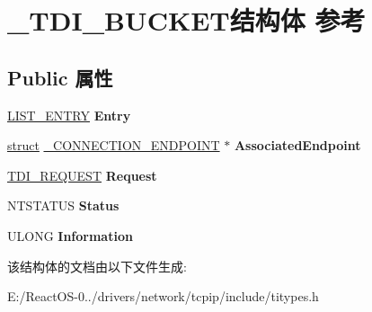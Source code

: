 \hypertarget{struct___t_d_i___b_u_c_k_e_t}{}\section{\+\_\+\+T\+D\+I\+\_\+\+B\+U\+C\+K\+E\+T结构体 参考}
\label{struct___t_d_i___b_u_c_k_e_t}
\subsection*{Public 属性}
\begin{DoxyCompactItemize}
\item 
\mbox{\label{struct___t_d_i___b_u_c_k_e_t_a331da78f8ad835b6eae14d8b280ae191}} 
\hyperlink{struct___l_i_s_t___e_n_t_r_y}{L\+I\+S\+T\+\_\+\+E\+N\+T\+RY} {\bfseries Entry}
\item 
\mbox{\label{struct___t_d_i___b_u_c_k_e_t_afa0ca3bf7e26ec613fc67b97295ec8ce}} 
\hyperlink{interfacestruct}{struct} \hyperlink{struct___c_o_n_n_e_c_t_i_o_n___e_n_d_p_o_i_n_t}{\+\_\+\+C\+O\+N\+N\+E\+C\+T\+I\+O\+N\+\_\+\+E\+N\+D\+P\+O\+I\+NT} $\ast$ {\bfseries Associated\+Endpoint}
\item 
\mbox{\label{struct___t_d_i___b_u_c_k_e_t_abafa54d41d27f793e618716a8bbd9cf4}} 
\hyperlink{struct___t_d_i___r_e_q_u_e_s_t}{T\+D\+I\+\_\+\+R\+E\+Q\+U\+E\+ST} {\bfseries Request}
\item 
\mbox{\label{struct___t_d_i___b_u_c_k_e_t_a744ff2f093a578ea983a448e2bf83751}} 
N\+T\+S\+T\+A\+T\+US {\bfseries Status}
\item 
\mbox{\label{struct___t_d_i___b_u_c_k_e_t_a92c45eafb028028700504727dbc6f20e}} 
U\+L\+O\+NG {\bfseries Information}
\end{DoxyCompactItemize}


该结构体的文档由以下文件生成\+:\begin{DoxyCompactItemize}
\item 
E\+:/\+React\+O\+S-\/0../drivers/network/tcpip/include/titypes.\+h\end{DoxyCompactItemize}
